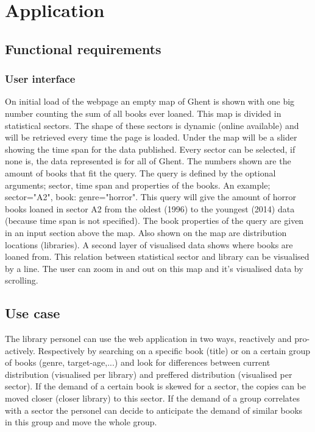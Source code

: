 \chapter{Application}


\section{Functional requirements}

\subsection{User interface}

On initial load of the webpage an empty map of Ghent is shown with one big number counting the sum of all books ever loaned. This map is divided in statistical sectors. The shape of these sectors is dynamic (online available) and will be retrieved every time the page is loaded. Under the map will be a slider showing the time span for the data published. Every sector can be selected, if none is, the data represented is for all of Ghent.  The numbers shown are the amount of books that fit the query. The query is defined by the optional arguments; sector, time span and properties of the books. An example; sector="A2", book: genre="horror". This query will give the amount of horror books loaned in sector A2 from the oldest (1996) to the youngest (2014) data (because time span is not specified). The book properties of the query are given in an input section above the map. Also shown on the map are distribution locations (libraries). A second layer of visualised data shows where books are loaned from. This relation between statistical sector and library can be visualised by a line. The user can zoom in and out on this map and it's visualised data by scrolling. 

\section{Use case}

The library personel can use the web application in two ways, reactively and pro-actively. Respectively by searching on a specific book (title) or on a certain group of books (genre, target-age,...) and look for differences between current distribution (visualised per library) and preffered distribution (visualised per sector). If the demand of a certain book is skewed for a sector, the copies can be moved closer (closer library) to this sector. If the demand of a group correlates with a sector the personel can decide to anticipate the demand of similar books in this group and move the whole group. 
